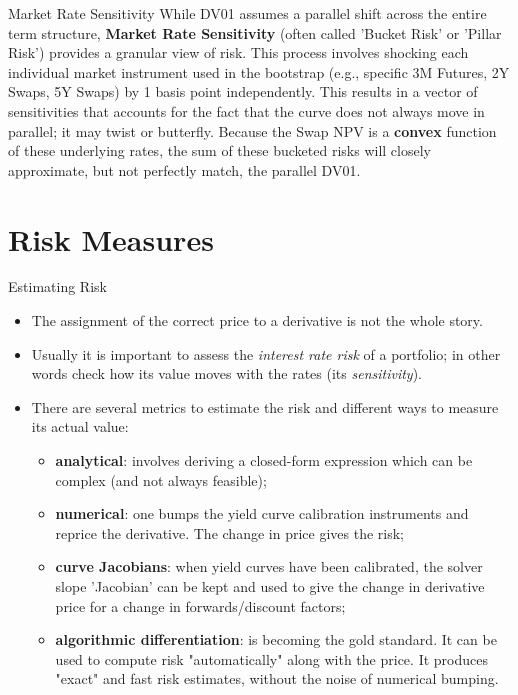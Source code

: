 \documentclass{beamer}
\begin{document}
\begin{frame}{Market Rate Sensitivity}
While DV01 assumes a parallel shift across the entire term structure, \textbf{Market Rate Sensitivity} (often called 'Bucket Risk' or 'Pillar Risk') provides a granular view of risk.
This process involves shocking each individual market instrument used in the bootstrap (e.g., specific 3M Futures, 2Y Swaps, 5Y Swaps) by 1 basis point independently.
This results in a vector of sensitivities that accounts for the fact that the curve does not always move in parallel; it may twist or butterfly.
Because the Swap NPV is a \textbf{convex} function of these underlying rates, the sum of these bucketed risks will closely approximate, but not perfectly match, the parallel DV01.
\end{frame}

	\section{Risk Measures}
\begin{frame}{Estimating Risk}
	\begin{itemize}
		\item The assignment of the correct price to a derivative is not the whole story.
		\item Usually it is important to assess the \emph{interest rate risk} of a portfolio; in other words check how its value moves with the rates (its \emph{sensitivity}).
		\item There are several metrics to estimate the risk and different ways to measure its actual value:
		\begin{itemize}
			\item \textbf{analytical}: involves deriving a closed-form expression which can be complex (and not always feasible);
			\item \textbf{numerical}: one bumps the yield curve calibration instruments and reprice the derivative. The change in price gives the risk;
			\item \textbf{curve Jacobians}: when yield curves have been calibrated, the solver slope 'Jacobian' can be kept and used to give the change in derivative price for a change in forwards/discount factors;
			\item \textbf{algorithmic differentiation}: is becoming the gold standard. It can be used to compute risk "automatically" along with the price. It produces "exact" and fast risk estimates, without the noise of numerical bumping.
		\end{itemize}
		
	\end{itemize}
\end{frame}
\end{document}
